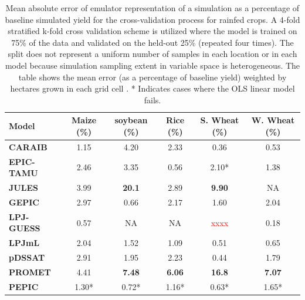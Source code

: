 \documentclass[gmd, manuscript]{copernicus} %
\begin{document}
\begin{table}[ht]
    \caption{
    Mean absolute error of emulator representation of a simulation as a percentage of baseline simulated yield for the cross-validation process for rainfed crops. 
    A 4-fold stratified k-fold cross validation scheme is utilized where the model is trained on 75\% of the data and validated on the held-out 25\% (repeated four times). 
    The split does not represent a uniform number of samples in each location or in each model because simulation sampling extent in variable space is heterogeneous. 
    The table shows the mean error (as a percentage of baseline yield) weighted by hectares grown in each grid cell \citep{Portmann2010}.
    * Indicates cases where the OLS linear model fails.
    } 
    \label{table:ASE}
    \begin{tabular}{l | c | c | c | c | c} 
        \hline
        \textbf{Model}     & \textbf{Maize (\%)} & \textbf{soybean (\%)} & \textbf{Rice (\%)} & \textbf{S. Wheat (\%)} & \textbf{W. Wheat (\%)} \\ \hline
        \textbf{CARAIB}    & 1.15  & 4.20  & 2.33  & 0.36  & 0.53   \\ \hline
        \textbf{EPIC-TAMU} & 2.46  & 3.35  & 0.56  & 2.10* & 1.38   \\ \hline
        \textbf{JULES}     & 3.99  & \textbf{20.1} & 2.89  & \textbf{9.90}  & NA     \\ \hline
        \textbf{GEPIC}     & 2.97  & 0.66  & 2.17  & 1.60  & 2.04   \\ \hline
        \textbf{LPJ-GUESS} & 0.57  & NA    & NA    & \textcolor{red}{xxxx}  & 0.18   \\ \hline
        \textbf{LPJmL}     & 2.04  & 1.52  & 1.09  & 0.51  & 0.65   \\ \hline
        \textbf{pDSSAT}    & 2.91  & 1.95  & 2.23  & 0.44  & 1.79   \\ \hline
        \textbf{PROMET}    & 4.41  & \textbf{7.48} & \textbf{6.06}  & \textbf{16.8}  & \textbf{7.07}   \\ \hline
        \textbf{PEPIC}     & 1.30* & 0.72* & 1.16* & 0.63* & 1.65*  \\ \hline
    \end{tabular}
\end{table}
\end{document}
